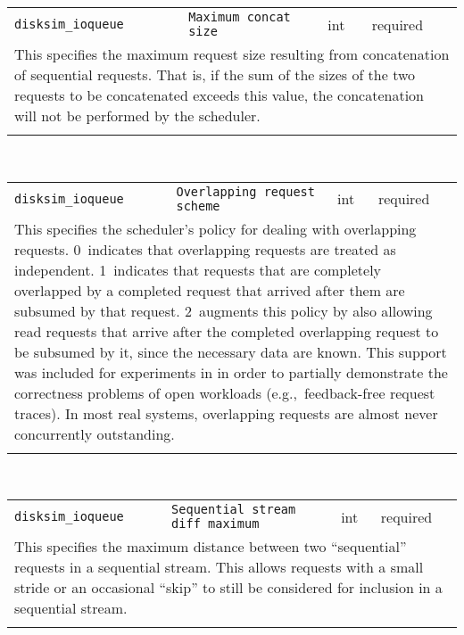 \noindent 
\begin{tabular}{|p{\lpmodwidth}|p{\lpnamewidth}|p{0.5in}|p{0.5in}|}
\cline{1-4}
\texttt{disksim\_ioqueue} & \texttt{Maximum concat size} & int & required \\ 
\cline{1-4}
\multicolumn{4}{|p{6in}|}{
This specifies the maximum request size resulting from concatenation of
sequential requests. That is, if the sum of the sizes of the two
requests to be concatenated exceeds this value, the concatenation will
not be performed by the scheduler.
}\\ 
\cline{1-4}
\multicolumn{4}{p{5in}}{}\\
\end{tabular}\\ 
\noindent 
\begin{tabular}{|p{\lpmodwidth}|p{\lpnamewidth}|p{0.5in}|p{0.5in}|}
\cline{1-4}
\texttt{disksim\_ioqueue} & \texttt{Overlapping request scheme} & int & required \\ 
\cline{1-4}
\multicolumn{4}{|p{6in}|}{
This specifies the scheduler's policy for dealing with overlapping
requests.
0~indicates that overlapping requests are treated as independent.
1~indicates that requests that are completely overlapped by a
completed request that arrived after them are subsumed by that
request.
2~augments this policy by also allowing read requests that arrive
after the completed overlapping request to be subsumed by it, since
the necessary data are known. This support was included for
experiments in \cite{Ganger95} in order to partially demonstrate the
correctness problems of open workloads (e.g.,~feedback-free request
traces). In most real systems, overlapping requests are almost never
concurrently outstanding.
}\\ 
\cline{1-4}
\multicolumn{4}{p{5in}}{}\\
\end{tabular}\\ 
\noindent 
\begin{tabular}{|p{\lpmodwidth}|p{\lpnamewidth}|p{0.5in}|p{0.5in}|}
\cline{1-4}
\texttt{disksim\_ioqueue} & \texttt{Sequential stream diff maximum} & int & required \\ 
\cline{1-4}
\multicolumn{4}{|p{6in}|}{
This specifies the maximum distance between two ``sequential'' requests in
a sequential stream. This allows requests with a small stride or an
occasional ``skip'' to still be considered for inclusion in a
sequential stream.
}\\ 
\cline{1-4}
\multicolumn{4}{p{5in}}{}\\
\end{tabular}\\ 

